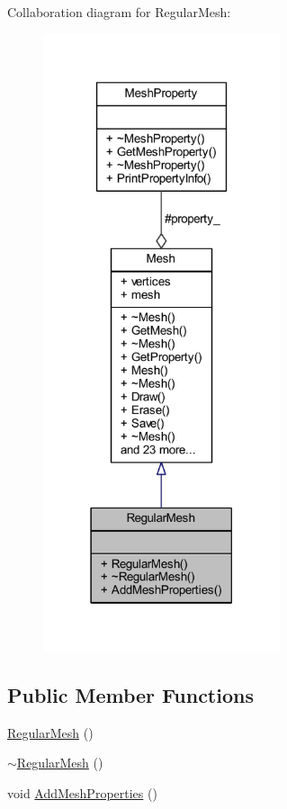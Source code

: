Collaboration diagram for Regular\+Mesh\+:
\nopagebreak
\begin{figure}[H]
\begin{center}
\leavevmode
\includegraphics[width=197pt]{class_regular_mesh__coll__graph}
\end{center}
\end{figure}
\subsection*{Public Member Functions}
\begin{DoxyCompactItemize}
\item 
\mbox{\hyperlink{class_regular_mesh_a96ec7f2ab73178638c6887b8a37735ac}{Regular\+Mesh}} ()
\item 
\mbox{\hyperlink{class_regular_mesh_aca610c9b242297893cdc2dc2f427b89e}{$\sim$\+Regular\+Mesh}} ()
\item 
void \mbox{\hyperlink{class_regular_mesh_a1f24f9c533797074ade33aee4e97cfb6}{Add\+Mesh\+Properties}} ()
\end{DoxyCompactItemize}
